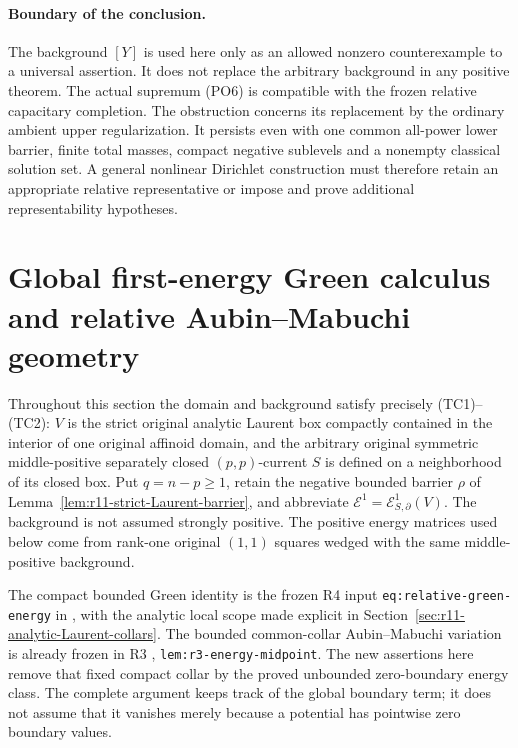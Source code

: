 \documentclass[11pt,a4paper]{article}
\numberwithin{equation}{section}
\theoremstyle{definition}
\theoremstyle{remark}
\begin{document}
\paragraph{Boundary of the conclusion.}
The background $[Y]$ is used here only as an allowed nonzero
counterexample to a universal assertion. It does not replace
the arbitrary background in any positive theorem.
The actual supremum (PO6) is compatible with the frozen
relative capacitary completion. The obstruction concerns its
replacement by the ordinary ambient upper regularization.
It persists even with one common all-power lower barrier,
finite total masses, compact negative sublevels and a
nonempty classical solution set. A general nonlinear
Dirichlet construction must therefore retain an appropriate
relative representative or impose and prove additional
representability hypotheses.



\section{Global first-energy Green calculus and relative Aubin--Mabuchi geometry}
\label{sec:r11-global-first-energy}

Throughout this section the domain and background satisfy precisely
(TC1)--(TC2): $V$ is the strict original analytic Laurent box compactly
contained in the interior of one original affinoid domain, and the
arbitrary original symmetric middle-positive separately closed
$(p,p)$-current $S$ is defined on a neighborhood of its closed box.
Put $q=n-p\geq1$, retain the negative bounded barrier $\rho$ of
Lemma~\ref{lem:r11-strict-Laurent-barrier}, and abbreviate
$\mathcal E^1=\mathcal E^1_{S,\partial}(V)$.
The background is not assumed strongly positive. The positive energy
matrices used below come from rank-one original $(1,1)$ squares
wedged with the same middle-positive background.

The compact bounded Green identity is the frozen R4 input
\texttt{eq:relative-green-energy} in
, with the analytic local
scope made explicit in Section~\ref{sec:r11-analytic-Laurent-collars}.
The bounded common-collar Aubin--Mabuchi variation is already frozen
in R3 ,
\texttt{lem:r3-energy-midpoint}. The new assertions here remove that
fixed compact collar by the proved unbounded zero-boundary energy
class. The complete argument keeps track of the global boundary
term; it does not assume that it vanishes merely because a potential
has pointwise zero boundary values.
\end{document}
